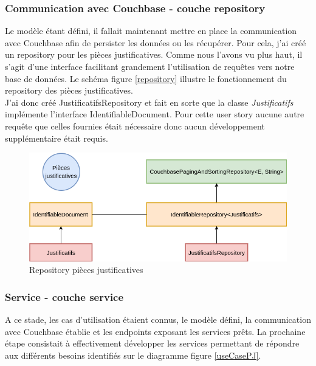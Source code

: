 	
	\subsubsection{Communication avec Couchbase - couche repository}
	
	Le modèle étant défini, il fallait maintenant mettre en place la communication avec Couchbase afin de persister les données ou les récupérer. Pour cela, j'ai créé un repository pour les pièces justificatives. Comme nous l'avons vu plus haut, il s'agit d'une interface facilitant grandement l'utilisation de requêtes vers notre base de données. Le schéma figure \ref{repository} illustre le fonctionnement du repository des pièces justificatives. \\
	
	J'ai donc créé JustificatifsRepository et fait en sorte que la classe \textit{Justificatifs} implémente l'interface IdentifiableDocument. Pour cette user story aucune autre requête que celles fournies était nécessaire donc aucun développement supplémentaire était requis. \\

\begin{figure}[h!]
	\includegraphics[scale=0.55]{images/travailBP1818/piecesJustif/repositoryPJ.png}
	\centering
	\caption{Repository pièces justificatives}
	\label{repositoryPJ}
\end{figure}
		
	\subsubsection{Service - couche service}
	
	A ce stade, les cas d'utilisation étaient connus, le modèle défini, la communication avec Couchbase établie et les endpoints exposant les services prêts. La prochaine étape consistait à effectivement développer les services permettant de répondre aux différents besoins identifiés sur le diagramme figure \ref{useCasePJ}.
	
